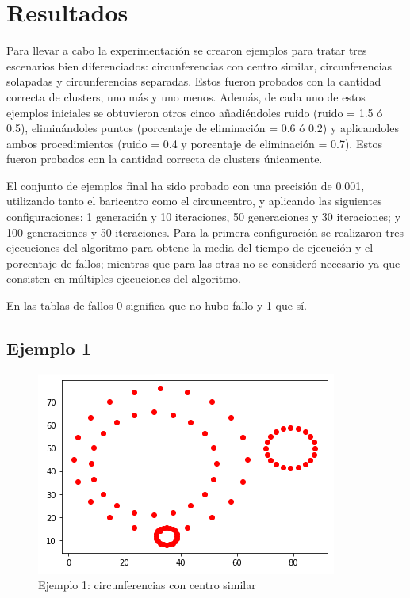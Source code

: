 \documentclass[conference,a4paper]{IEEEtran}
\begin{document}
\section{Resultados}

Para llevar a cabo la experimentación se crearon ejemplos para tratar tres escenarios bien diferenciados: circunferencias con centro similar, circunferencias solapadas y circunferencias separadas. Estos fueron probados con la cantidad correcta de clusters, uno más y uno menos. Además, de cada uno de estos ejemplos iniciales se obtuvieron otros cinco añadiéndoles ruido (ruido = 1.5 ó 0.5), eliminándoles puntos (porcentaje de eliminación = 0.6 ó 0.2) y aplicandoles ambos procedimientos (ruido = 0.4 y porcentaje de eliminación = 0.7). Estos fueron probados con la cantidad correcta de clusters únicamente.

El conjunto de ejemplos final ha sido probado con una precisión de 0.001, utilizando tanto el baricentro como el circuncentro, y aplicando las siguientes configuraciones: 1 generación y 10 iteraciones, 50 generaciones y 30 iteraciones; y 100 generaciones y 50 iteraciones. Para la primera configuración se realizaron tres ejecuciones del algoritmo para obtene la media del tiempo de ejecución y el porcentaje de fallos; mientras que para las otras no se consideró necesario ya que consisten en múltiples ejecuciones del algoritmo.

En las tablas de fallos 0 significa que no hubo fallo y 1 que sí.

\subsection{Ejemplo 1}

\begin{figure}[H]
\centering
\includegraphics[scale=0.8]{Experimentacion/Ejemplo1/Ejemplo1}
\caption{Ejemplo 1: circunferencias con centro similar\\}
\end{figure}
\end{document}
